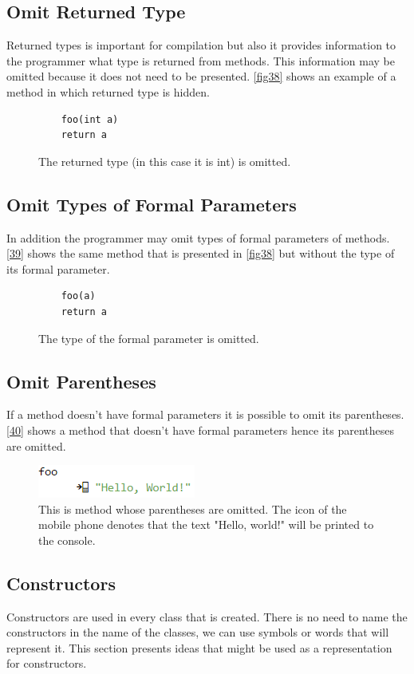 \subsection{Omit Returned Type}
Returned types is important for compilation but also it provides information to the programmer what type is returned from methods. This information may be omitted because it does not need to be presented. \autoref{fig38} shows an example of a method in which returned type is hidden.
\begin{figure}[H]
	\begin{lstlisting}
	foo(int a)
	return a
	\end{lstlisting}
	\caption{The returned type (in this case it is int) is omitted.}
	\label{fig38}
\end{figure}
\subsection{Omit Types of Formal Parameters}
In addition the programmer may omit types of formal parameters of methods. \autoref{39} shows the same method that is presented in \autoref{fig38} but without the type of its formal parameter.
\begin{figure}[H]
	\begin{lstlisting}
	foo(a)
	return a
	\end{lstlisting}
	\caption{The type of the formal parameter is omitted.}
	\label{fig39}
\end{figure}
\subsection{Omit Parentheses}
If a method doesn't have formal parameters it is possible to omit its parentheses. \autoref{40} shows a method that doesn't have formal parameters hence its parentheses are omitted.
\begin{figure}[H]
	\includegraphics{"./fig/foo with omitted parentheses"}
	\caption{This is method whose parentheses are omitted. The icon of the mobile phone denotes that the text "Hello, world!" will be printed to the console.}
	\label{fig40}
\end{figure}
\subsection{Constructors}
Constructors are used in every class that is created. There is no need to name the constructors in the name of the classes, we can use symbols or words that will represent it. This section presents ideas that might be used as a representation for constructors.

